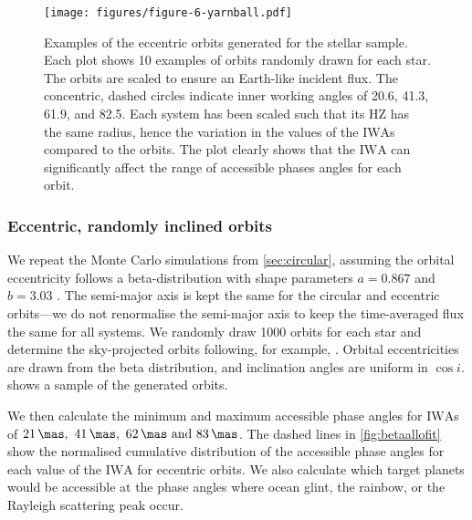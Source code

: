 \documentclass[usenatbib]{mnras}
\newcommand{\IWA}{\ensuremath{\mathrm{IWA}}\xspace}
\begin{document}
\begin{figure*}
    \centering
    \texttt{[image: figures/figure-6-yarnball.pdf]}  
    \caption{
        Examples of the eccentric orbits generated for the stellar sample. 
        Each plot shows 10 examples of orbits randomly drawn for each star.
        The orbits are scaled to ensure an Earth-like incident flux.
        The concentric, dashed circles indicate inner working angles of \num{20.6}, \num{41.3}, \num{61.9}, and \qty{82.5}{\mas}.
        Each system has been scaled such that its HZ has the same radius, hence the variation in the values of the \IWA{}s compared to the orbits.
        The plot clearly shows that the \IWA can significantly affect the range of accessible phases angles for each orbit.
    }
    \label{fig:ball-o-yarn}
\end{figure*}

\subsubsection{Eccentric, randomly inclined orbits}
\label{sec:eccentric}

We repeat the Monte Carlo simulations from \cref{sec:circular}, assuming the orbital eccentricity follows a beta-distribution with shape parameters $a=0.867$ and $b=3.03$ \citep{2013MNRAS.434L..51K}. 
%
The semi-major axis is kept the same for the circular and eccentric orbits---we do not renormalise the semi-major axis to keep the time-averaged flux the same for all systems.
%
We randomly draw \num{1000} orbits for each star and determine the sky-projected orbits following, for example, \citet{2010exop.book...15M}. 
%
Orbital eccentricities are drawn from the beta distribution, and inclination angles are uniform in $\cos i$. 
%
 shows a sample of the generated orbits.

We then calculate the minimum and maximum accessible phase angles for \IWA{}s of $\qtylist{21; 41; 62; 83}{\mas}$.
%
The dashed lines in \cref{fig:betaallofit} show the normalised cumulative distribution of the accessible phase angles for each value of the \IWA for eccentric orbits. 
%
We also calculate which target planets would be accessible at the phase angles where ocean glint, the rainbow, or the Rayleigh scattering peak occur.
\end{document}
